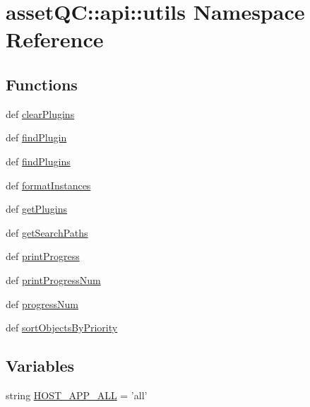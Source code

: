 \hypertarget{namespaceassetQC_1_1api_1_1utils}{\section{asset\-Q\-C\-:\-:api\-:\-:utils \-Namespace \-Reference}
\label{d2/d37/namespaceassetQC_1_1api_1_1utils}
}
\subsection*{\-Functions}
\begin{DoxyCompactItemize}
\item 
def \hyperlink{namespaceassetQC_1_1api_1_1utils_abe066b440b985a7cadb4872aa49ff748}{clear\-Plugins}
\item 
def \hyperlink{namespaceassetQC_1_1api_1_1utils_a99957955d5d3bbf94e08f9dda097d3c3}{find\-Plugin}
\item 
def \hyperlink{namespaceassetQC_1_1api_1_1utils_ad8250bdcf020e4f61a323782eec52416}{find\-Plugins}
\item 
def \hyperlink{namespaceassetQC_1_1api_1_1utils_ae3cff6d54d4c94976b9164c2c351a24f}{format\-Instances}
\item 
def \hyperlink{namespaceassetQC_1_1api_1_1utils_adb053a6c47f07e3326657db5f4c8f879}{get\-Plugins}
\item 
def \hyperlink{namespaceassetQC_1_1api_1_1utils_a57dc61643aef549e8d74a142c47d52f6}{get\-Search\-Paths}
\item 
def \hyperlink{namespaceassetQC_1_1api_1_1utils_aabac01f23742a5115eb4ed149afc3a25}{print\-Progress}
\item 
def \hyperlink{namespaceassetQC_1_1api_1_1utils_abbade4735019457fea46e0ad15b00933}{print\-Progress\-Num}
\item 
def \hyperlink{namespaceassetQC_1_1api_1_1utils_a239e40b09df7daa90b8a0ff82a14c05b}{progress\-Num}
\item 
def \hyperlink{namespaceassetQC_1_1api_1_1utils_a512a443391756a37dc085771b7152355}{sort\-Objects\-By\-Priority}
\end{DoxyCompactItemize}
\subsection*{\-Variables}
\begin{DoxyCompactItemize}
\item 
string \hyperlink{namespaceassetQC_1_1api_1_1utils_a246070f0bec149bf994a2364083a3a20}{\-H\-O\-S\-T\-\_\-\-A\-P\-P\-\_\-\-A\-L\-L} = 'all'
\end{DoxyCompactItemize}


